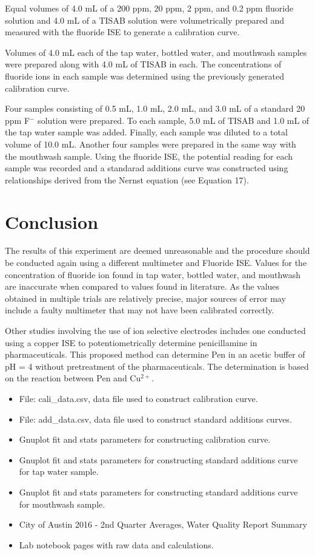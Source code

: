 \documentclass[journal=jacsat,manuscript=article,layout=twocolumn]{achemso}
\begin{document}
Equal volumes of 4.0 mL of a 200 ppm, 20 ppm, 2 ppm, and 0.2 ppm fluoride
solution and 4.0 mL of a TISAB solution were volumetrically prepared and
measured with the fluoride ISE to generate a calibration curve.

Volumes of 4.0 mL each of the tap water, bottled water, and mouthwash samples
were prepared along with 4.0 mL of TISAB in each. The concentrations of fluoride
ions in each sample was determined using the previously generated calibration
curve.

Four samples consisting of 0.5 mL, 1.0 mL, 2.0 mL, and 3.0 mL of a standard 20
ppm F$^-$ solution were prepared. To each sample, 5.0 mL of TISAB and 1.0 mL of
the tap water sample was added. Finally, each sample was diluted to a total
volume of 10.0 mL. Another four samples were prepared in the same way with the
mouthwash sample. Using the fluoride ISE, the potential reading for each sample
was recorded and a standarad additions curve was constructed using relationships
derived from the Nernst equation (see Equation 17).

\section {Conclusion}
The results of this experiment are deemed unreasonable and the procedure should
be conducted again using a different multimeter and Fluoride ISE. Values for the
concentration of fluoride ion found in tap water, bottled water, and mouthwash
are inaccurate when compared to values found in literature. As the values
obtained in multiple trials are relatively precise, major sources of error may
include a faulty multimeter that may not have been calibrated correctly.

Other studies involving the use of ion selective electrodes includes one
conducted using a copper ISE to potentiometrically determine penicillamine in
pharmaceuticals. \cite{pen} This proposed method can determine Pen in an acetic
buffer of pH = 4 without pretreatment of the pharmaceuticals.  The determination
is based on the reaction between Pen and Cu$^{2+}$.


\begin {suppinfo}
\begin{itemize}
    \item File: cali\_data.csv, data file used to construct calibration curve.
    \item File: add\_data.csv, data file used to construct standard additions curves.
    \item Gnuplot fit and stats parameters for constructing calibration curve.
    \item Gnuplot fit and stats parameters for constructing standard additions
        curve for tap water sample.
    \item Gnuplot fit and stats parameters for constructing standard additions
        curve for mouthwash sample.
    \item City of Austin 2016 - 2nd Quarter Averages, Water Quality Report
        Summary
    \item Lab notebook pages with raw data and calculations.
\end{itemize}
\end {suppinfo}
\end{document}
